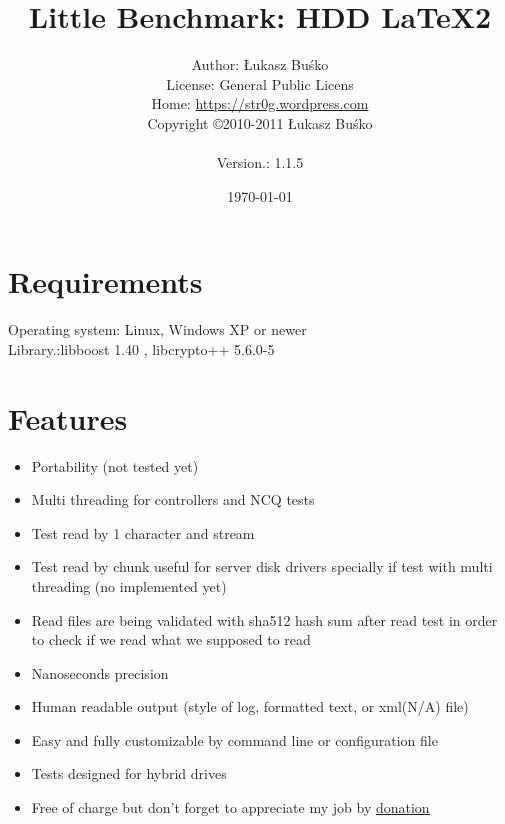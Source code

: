\documentclass[a4paper]{article}
\begin{document}
\title{Little Benchmark: HDD  \LaTeX2}
\author{Author: Łukasz Buśko
\\License: General Public Licens
\\Home:  \href{http://str0g.wordpress.com}{https://str0g.wordpress.com}
\\Copyright \copyright 2010-2011 Łukasz Buśko\\
\date{\today} Version.: 1.1.5}
\maketitle
\newpage
\tableofcontents
\newpage

\section{Requirements}
Operating system: Linux, Windows XP or newer\\
Library.:libboost 1.40 , libcrypto++ 5.6.0-5
\section{Features}
\begin{itemize}
\item Portability (not tested yet)
\item Multi threading for controllers and NCQ tests
\item Test read by 1 character and stream
\item Test read by chunk useful for server disk drivers specially if test with multi threading (no implemented yet)
\item Read files are being validated with sha512 hash sum after read test in order to check if we read what we supposed to read
\item Nanoseconds precision
\item Human readable output (style of log, formatted text, or xml(N/A) file)
\item Easy and fully customizable by command line or configuration file
\item Tests designed for hybrid drives
\item Free of charge but don't forget to appreciate my job by \href{http://str0g.wordpress.com/about/}{\underline{donation}}
\end{itemize}

\newpage

\newpage


\newpage


\newpage

\end{document}
